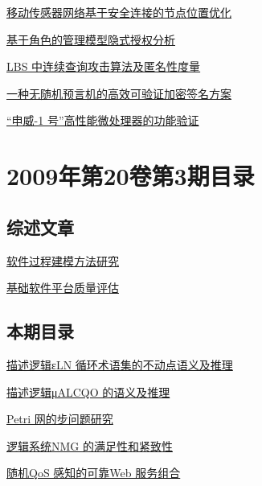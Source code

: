 \documentclass[a4paper]{article}
\begin{document}
\href{http://www.jos.org.cn/ch/reader/download_pdf.aspx?file_no=3251&year_id=2009&quarter_id=4&falg=1}{移动传感器网络基于安全连接的节点位置优化}

\href{http://www.jos.org.cn/ch/reader/download_pdf.aspx?file_no=3261&year_id=2009&quarter_id=4&falg=1}{基于角色的管理模型隐式授权分析}

\href{http://www.jos.org.cn/ch/reader/download_pdf.aspx?file_no=3428&year_id=2009&quarter_id=4&falg=1}{LBS 中连续查询攻击算法及匿名性度量}

\href{http://www.jos.org.cn/ch/reader/download_pdf.aspx?file_no=555&year_id=2009&quarter_id=4&falg=1}{一种无随机预言机的高效可验证加密签名方案}

\href{http://www.jos.org.cn/ch/reader/download_pdf.aspx?file_no=3602&year_id=2009&quarter_id=4&falg=1}{“申威-1 号”高性能微处理器的功能验证}


\section{\textbf{2009年第20卷第3期目录}}
\subsection{综述文章}
\href{http://www.jos.org.cn/ch/reader/download_pdf.aspx?file_no=3432&year_id=2009&quarter_id=3&falg=1}{软件过程建模方法研究}

\href{http://www.jos.org.cn/ch/reader/download_pdf.aspx?file_no=3443&year_id=2009&quarter_id=3&falg=1}{基础软件平台质量评估}

\subsection{本期目录}
\href{http://www.jos.org.cn/ch/reader/download_pdf.aspx?file_no=3215&year_id=2009&quarter_id=3&falg=1}{描述逻辑εLN 循环术语集的不动点语义及推理}

\href{http://www.jos.org.cn/ch/reader/download_pdf.aspx?file_no=3255&year_id=2009&quarter_id=3&falg=1}{描述逻辑μALCQO 的语义及推理}

\href{http://www.jos.org.cn/ch/reader/download_pdf.aspx?file_no=3281&year_id=2009&quarter_id=3&falg=1}{Petri 网的步问题研究}

\href{http://www.jos.org.cn/ch/reader/download_pdf.aspx?file_no=3381&year_id=2009&quarter_id=3&falg=1}{逻辑系统NMG 的满足性和紧致性}

\href{http://www.jos.org.cn/ch/reader/download_pdf.aspx?file_no=3339&year_id=2009&quarter_id=3&falg=1}{随机QoS 感知的可靠Web 服务组合}
\end{document}
